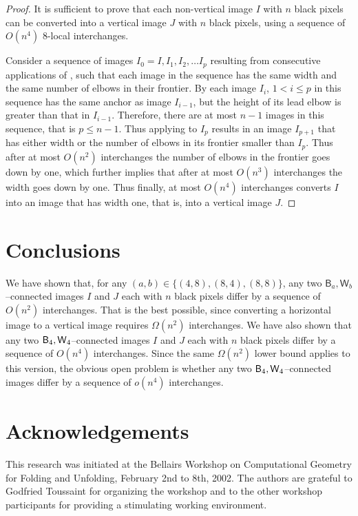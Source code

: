 \documentclass[lotsofwhite,charterfonts]{patmorin}
\newcommand{\fourfour}{\ensuremath{\protect\textup{\textsf{B}}_{4},\protect\textup{\textsf{W}}_{4}}}
\begin{document}
\begin{proof}
It is sufficient to prove that each non-vertical image $I$ with $n$ black pixels can be converted into a vertical image $J$ with $n$ black pixels, using a sequence of $O(n^4)$ 8-local interchanges. 

Consider a sequence of images $I_0=I, I_1, I_2, \dots I_p$ resulting
from consecutive applications of , such that each
image in the sequence has the same width and the same number of elbows
in their frontier. By  each image $I_i$, $1<i\leq p$
in this sequence has the same anchor as image $I_{i-1}$, but the
height of its lead elbow is greater than that in $I_{i-1}$. Therefore,
there are at most $n-1$ images in this sequence, that is $p\leq n-1$.
Thus applying  to $I_p$ results in an image
$I_{p+1}$ that has either width or the number of elbows in its
frontier smaller than $I_p$. Thus after at most $O(n^2)$ interchanges
the number of elbows in the frontier goes down by one, which further
implies that after at most $O(n^3)$ interchanges the width goes down
by one. Thus finally, at most $O(n^4)$ interchanges converts $I$ into
an image that has width one, that is, into a vertical image $J$.
\end{proof}


\section{Conclusions} 

We have shown that, for any $(a,b)\in\{(4,8),(8,4),(8,8)\}$, any two
$\textsf{B}_a,\textsf{W}_b$--connected images $I$ and $J$ each with
$n$ black pixels differ by a sequence of $O(n^2)$ interchanges. That
is the best possible, since converting a horizontal image to a
vertical image requires $\Omega(n^2)$ interchanges. We have also shown
that any two \fourfour--connected images $I$ and $J$ each with $n$
black pixels differ by a sequence of $O(n^4)$ interchanges. Since the
same $\Omega(n^2)$ lower bound applies to this version, the obvious
open problem is whether any two \fourfour--connected images  differ by
a sequence of $o(n^4)$ interchanges.

\section*{Acknowledgements}

This research was initiated at the Bellairs Workshop on Computational
Geometry for Folding and Unfolding, February 2nd to 8th, 2002.  The
authors are grateful to Godfried Toussaint for organizing the workshop
and to the other workshop participants for providing a stimulating
working environment.



\end{document}
